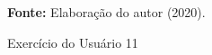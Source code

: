\begin{figure}[ht!]
\centering

\caption{\textmd{Exercício do Usuário 11}}
\label{fig:errodevnesp}

\par\medskip\textbf{Fonte:} Elaboração do autor (2020). \par\medskip

\end{figure}

